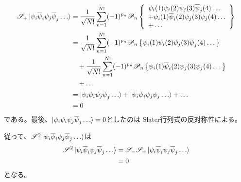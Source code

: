 \begin{align}
	\mathscr{S}_+ \ket{\aorb{\psi}_i\borb{\psi}_i\aorb{\psi}_j\borb{\psi}_j\dots}
&=
	\frac{1}{\sqrt{N!}}
	\sum_{n=1}^{N!}
		(-1)^{p_n}
		\mathscr{P}_n\left\{
		\begin{array}{l}
			\aorb{\psi}_i(1) \aorb{\psi}_i(2) \aorb{\psi}_j(3) \borb{\psi}_j(4) \dots \\
			+
			\aorb{\psi}_i(1) \borb{\psi}_i(2) \aorb{\psi}_j(3) \aorb{\psi}_j(4) \dots \\
			+
			\dots
		\end{array}
		\right\} \\
%
%
&=
	\frac{1}{\sqrt{N!}}
	\sum_{n=1}^{N!}
		(-1)^{p_n}
		\mathscr{P}_n\left\{
			\aorb{\psi}_i(1) \aorb{\psi}_i(2) \aorb{\psi}_j(3) \borb{\psi}_j(4) \dots
		\right\} \nonumber \\ &\quad
	+
	\frac{1}{\sqrt{N!}}
	\sum_{n=1}^{N!}
		(-1)^{p_n}
		\mathscr{P}_n\left\{
			\aorb{\psi}_i(1) \borb{\psi}_i(2) \aorb{\psi}_j(3) \aorb{\psi}_j(4) \dots
		\right\} \nonumber \\ &\quad
	+
	\dots \\
%
%
&=
	\ket{\aorb{\psi}_i\aorb{\psi}_i\aorb{\psi}_j\borb{\psi}_j\dots}
	+
	\ket{\aorb{\psi}_i\borb{\psi}_i\aorb{\psi}_j\aorb{\psi}_j\dots}
	+
	\dots \\
%
%
&=
	0
\end{align}
である。最後、$\ket{{\psi}_i{\psi}_i{\psi}_j{\overline{\psi}}_j\dots}=0$としたのは
Slater行列式の反対称性による。

従って、$\mathscr{S}^2\ket{{\psi}_i{\overline{\psi}}_i{\psi}_j{\overline{\psi}}_j\dots}$は
\begin{align}
	\mathscr{S}^2 \ket{\aorb{\psi}_i\borb{\psi}_i\aorb{\psi}_j\borb{\psi}_j\dots}
&=
	\mathscr{S}_- \mathscr{S}_+
		\ket{\aorb{\psi}_i\borb{\psi}_i\aorb{\psi}_j\borb{\psi}_j\dots} \\
%
%
&=
	0
\end{align}
となる。


